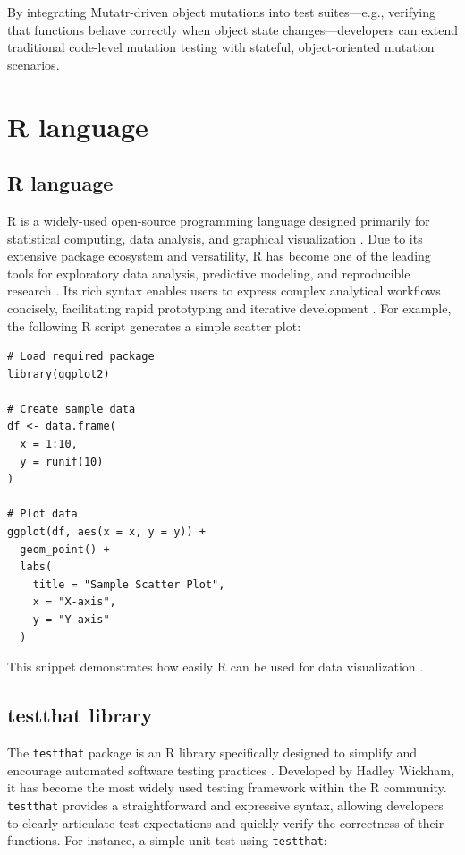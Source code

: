 By integrating Mutatr-driven object mutations into test suites—e.g., verifying that functions behave correctly when object state changes—developers can extend traditional code-level mutation testing with stateful, object-oriented mutation scenarios.

\section{R language}

\subsection{R language}

R is a widely-used open-source programming language designed primarily for statistical computing, data analysis, and graphical visualization \cite{R-base}. Due to its extensive package ecosystem and versatility, R has become one of the leading tools for exploratory data analysis, predictive modeling, and reproducible research \cite{wickham2014advanced}. Its rich syntax enables users to express complex analytical workflows concisely, facilitating rapid prototyping and iterative development \cite{wickham2019r4ds}. For example, the following R script generates a simple scatter plot:

\begin{verbatim}
# Load required package
library(ggplot2)

# Create sample data
df <- data.frame(
  x = 1:10,
  y = runif(10)
)

# Plot data
ggplot(df, aes(x = x, y = y)) +
  geom_point() +
  labs(
    title = "Sample Scatter Plot",
    x = "X-axis",
    y = "Y-axis"
  )
\end{verbatim}

This snippet demonstrates how easily R can be used for data visualization \cite{wickham2019r4ds}.

\subsection{testthat library}

The \texttt{testthat} package is an R library specifically designed to simplify and encourage automated software testing practices \cite{wickham2011testthat}. Developed by Hadley Wickham, it has become the most widely used testing framework within the R community. \texttt{testthat} provides a straightforward and expressive syntax, allowing developers to clearly articulate test expectations and quickly verify the correctness of their functions. For instance, a simple unit test using \texttt{testthat}:

